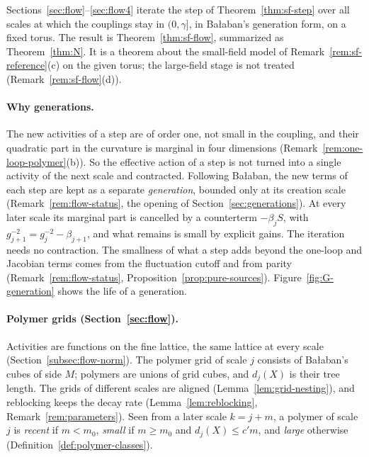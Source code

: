 \label{g:flow}

Sections~\ref{sec:flow}--\ref{sec:flow4} iterate the step of Theorem~\ref{thm:sf-step} over all scales at which the couplings stay in $(0,\gamma]$, in Ba\l aban's generation form, on a fixed torus. The result is Theorem~\ref{thm:sf-flow}, summarized as Theorem~\ref{thm:N}. It is a theorem about the small-field model of Remark~\ref{rem:sf-reference}(c) on the given torus; the large-field stage is not treated (Remark~\ref{rem:sf-flow}(d)).

\paragraph{Why generations.} The new activities of a step are of order one, not small in the coupling, and their quadratic part in the curvature is marginal in four dimensions (Remark~\ref{rem:one-loop-polymer}(b)). So the effective action of a step is not turned into a single activity of the next scale and contracted. Following Ba\l aban, the new terms of each step are kept as a separate \emph{generation}, bounded only at its creation scale (Remark~\ref{rem:flow-status}, the opening of Section~\ref{sec:generations}). At every later scale its marginal part is cancelled by a counterterm $-\beta_jS$, with $g_{j+1}^{-2}=g_j^{-2}-\beta_{j+1}$, and what remains is small by explicit gains. The iteration needs no contraction. The smallness of what a step adds beyond the one-loop and Jacobian terms comes from the fluctuation cutoff and from parity (Remark~\ref{rem:flow-status}, Proposition~\ref{prop:pure-sources}). Figure~\ref{fig:G-generation} shows the life of a generation.



\paragraph{Polymer grids (Section~\ref{sec:flow}).} Activities are functions on the fine lattice, the same lattice at every scale (Section~\ref{subsec:flow-norm}). The polymer grid of scale $j$ consists of Ba\l aban's cubes of side $M$; polymers are unions of grid cubes, and $d_j(X)$ is their tree length. The grids of different scales are aligned (Lemma~\ref{lem:grid-nesting}), and reblocking keeps the decay rate (Lemma~\ref{lem:reblocking}, Remark~\ref{rem:parameters}). Seen from a later scale $k=j+m$, a polymer of scale $j$ is \emph{recent} if $m<m_0$, \emph{small} if $m\ge m_0$ and $d_j(X)\le c'm$, and \emph{large} otherwise (Definition~\ref{def:polymer-classes}).

